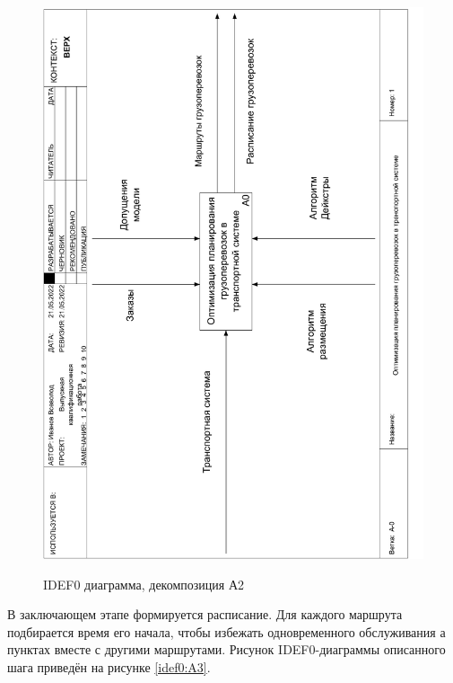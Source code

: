 \pagebreak
\begin{figure}[h]
	\begin{center}
		{\includegraphics[scale=0.63, angle=-90, page=4]{img/idef0.pdf}}
		\caption{IDEF0 диаграмма, декомпозиция А2}
		\label{idef0:A2}
	\end{center}
\end{figure}

В заключающем этапе формируется расписание. Для каждого маршрута подбирается время его начала, чтобы избежать одновременного обслуживания а пунктах вместе с другими маршрутами. Рисунок IDEF0-диаграммы описанного шага приведён на рисунке \ref{idef0:A3}.

